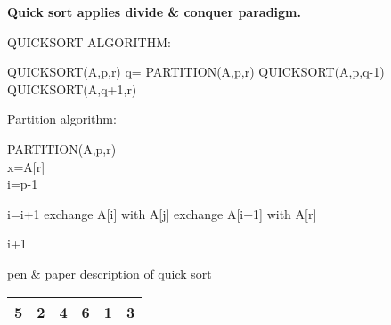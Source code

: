 \documentclass[12pt,a4paper]{article}
\begin{document}
\begin{center}
\textbf{Quick sort applies  divide \& conquer paradigm. }\\
\end{center}

\begin{algorithm}
\caption{QUICKSORT ALGORITHM: }
\vspace*{.2 cm}
\begin{algorithmic}

\STATE QUICKSORT(A,p,r)
\STATE q= PARTITION(A,p,r)
\STATE QUICKSORT(A,p,q-1)
\STATE QUICKSORT(A,q+1,r) 
\ENDIF
\end{algorithmic}
\end{algorithm}


\vspace{1 cm}

\begin{algorithm}
\caption{Partition algorithm: } 
\begin{algorithmic}
\STATE PARTITION(A,p,r)\\
\STATE x=A[r]\\
\STATE i=p-1 \\

\STATE i=i+1 
\ENDIF
\STATE exchange A[i] with A[j]
\ENDFOR
\STATE exchange A[i+1] with A[r]

\RETURN i+1 
 
\end{algorithmic}

\end{algorithm}


pen \& paper description of quick sort\:



\begin{table}[H]
\begin{tabular}{|l|l|l|l|l|l|}
\hline
5 & 2 & 4 & 6 & 1 & 3 \\ \hline
\end{tabular}
\end{table}



\end{document}
